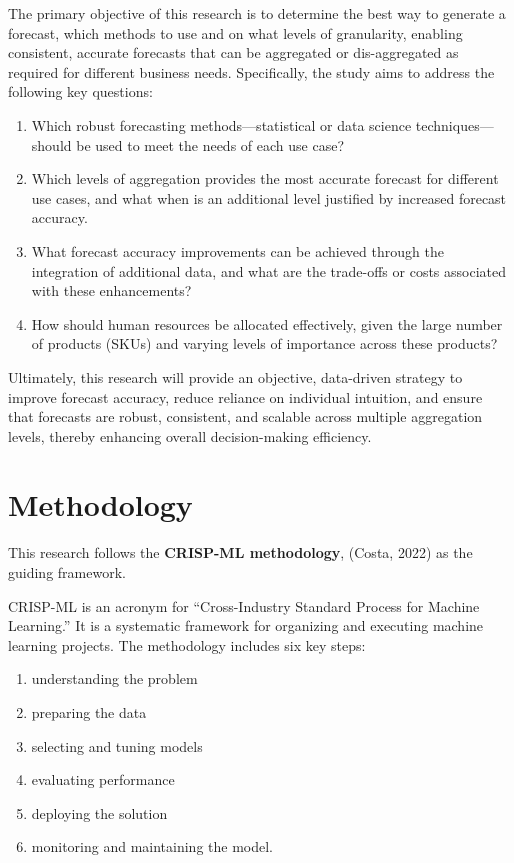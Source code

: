 \documentclass[
  american,
  10,
  a4paper,
]{book}
\providecommand{\tightlist}{%
  \setlength{\itemsep}{0pt}\setlength{\parskip}{0pt}}
\theoremstyle{definition}
\theoremstyle{remark}
\begin{document}
The primary objective of this research is to determine the best way to
generate a forecast, which methods to use and on what levels of
granularity, enabling consistent, accurate forecasts that can be
aggregated or dis-aggregated as required for different business needs.
Specifically, the study aims to address the following key questions:

\begin{enumerate}
\def\labelenumi{\arabic{enumi}.}
\tightlist
\item
  Which robust forecasting methods---statistical or data science
  techniques---should be used to meet the needs of each use case?
\item
  Which levels of aggregation provides the most accurate forecast for
  different use cases, and what when is an additional level justified by
  increased forecast accuracy.
\item
  What forecast accuracy improvements can be achieved through the
  integration of additional data, and what are the trade-offs or costs
  associated with these enhancements?
\item
  How should human resources be allocated effectively, given the large
  number of products (SKUs) and varying levels of importance across
  these products?
\end{enumerate}

Ultimately, this research will provide an objective, data-driven
strategy to improve forecast accuracy, reduce reliance on individual
intuition, and ensure that forecasts are robust, consistent, and
scalable across multiple aggregation levels, thereby enhancing overall
decision-making efficiency.

\section{\texorpdfstring{\textbf{Methodology}}{Methodology}}\label{methodology}

This research follows the \textbf{CRISP-ML methodology}, (Costa, 2022)
as the guiding framework.

CRISP-ML is an acronym for ``Cross-Industry Standard Process for Machine
Learning.'' It is a systematic framework for organizing and executing
machine learning projects. The methodology includes six key steps:

\begin{enumerate}
\def\labelenumi{\arabic{enumi}.}
\tightlist
\item
  understanding the problem
\item
  preparing the data
\item
  selecting and tuning models
\item
  evaluating performance
\item
  deploying the solution
\item
  monitoring and maintaining the model.
\end{enumerate}
\end{document}
